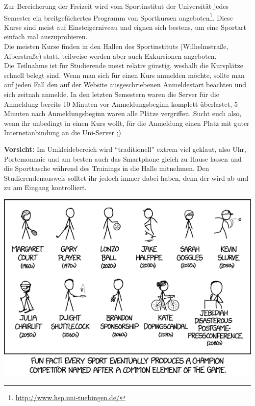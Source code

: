 Zur Bereicherung der Freizeit wird vom Sportinstitut der Universität jedes
Semester ein breitgefächertes Programm von Sportkursen
angeboten\footnote{\url{http://www.hsp.uni-tuebingen.de/}}. Diese Kurse sind
meist auf Einsteigerniveau und eignen sich bestens, um eine Sportart einfach
mal auszuprobieren.\\
Die meisten Kurse finden in den Hallen des Sportinstituts (Wilhelmstraße,
Alberstraße) statt, teilweise werden aber auch Exkursionen angeboten.\\
Die Teilnahme ist für Studierende meist relativ günstig, weshalb die Kursplätze
schnell belegt sind. Wenn man sich für einen Kurs anmelden möchte, sollte man
auf jeden Fall den auf der Website ausgeschriebenen Anmeldestart beachten und
sich zeitnah anmelde. In den letzten Semestern waren die Server für die
Anmeldung bereits 10 Minuten vor Anmeldungsbeginn komplett überlastet, 5
Minuten nach Anmeldungsbeginn waren alle Plätze vergriffen. Sucht euch also,
wenn ihr unbedingt in einen Kurs wollt, für die Anmeldung einen Platz mit guter
Internetanbindung an die Uni-Server ;)

\textbf{Vorsicht:} Im Umkleidebereich wird "`traditionell"' extrem viel
  geklaut, also Uhr, Portemonnaie und am besten auch das Smartphone gleich
  zu Hause lassen und die Sporttasche wäh\-rend des Trainings in
  die Halle mitnehmen. Den Studierendenausweis solltet ihr jedoch immer dabei haben, 
  denn der wird ab und zu am Eingang kontrolliert.
 
\vfill

\begin{center}
\includegraphics[width=0.8\hsize]{info/xkcd/sports_champions.png}
\end{center}
